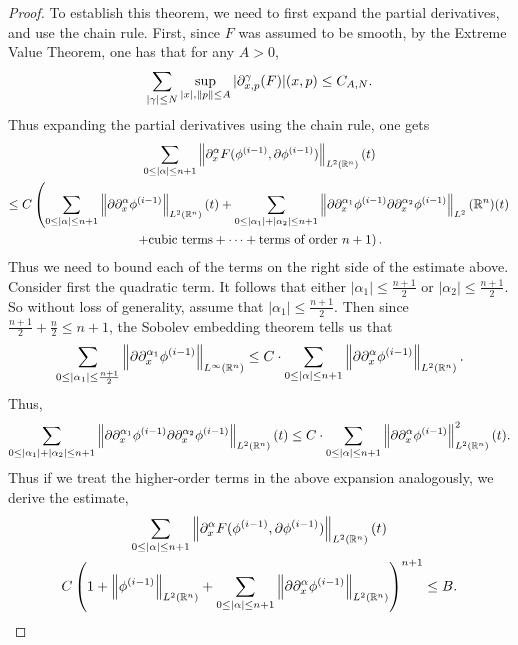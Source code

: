 \documentclass{article}
\begin{document}
\begin{proof}
	To establish this theorem, we need to first expand the partial derivatives, and use the chain rule. First, since $F$ was assumed to be smooth, by the Extreme Value Theorem, one has that for any $A > 0$, 
	\begin{equation*}
		\sum_{|\gamma|\leq N}\sup_{|x|, \left\Vert p \right\Vert\leq A}|\partial^{\gamma}_{x,p}(F)|(x, p) \leq C_{A, N}. 
	\end{equation*} 
	Thus expanding the partial derivatives using the chain rule, one gets 
	\begin{multline*} 
			\sum_{0 \leq |\alpha| \leq n + 1}\left\Vert \partial_{x}^{\alpha}F(\phi^{(i - 1)}, \partial\phi^{(i - 1)}) \right\Vert_{L^{2}(\mathbb{R}^{n})}(t) \\
			\leq C\left(\sum_{0 \leq |\alpha|\leq n + 1}\left\Vert \partial\partial_{x}^{\alpha}\phi^{(i - 1)} \right\Vert_{L^{2}(\mathbb{R}^{n})}(t) + \sum_{0 \leq |\alpha_{1}| + |\alpha_{2}| \leq n + 1}\left\Vert \partial\partial_{x}^{\alpha_{1}}\phi^{(i-1)}\partial\partial_{x}^{\alpha_{2}}\phi^{(i -1)} \right\Vert_{L^{2}}(\mathbb{R}^{n})(t)\right. \\
			\left. + \text{cubic terms} + \dotsm + \text{terms of order $n + 1$} \right). 
	\end{multline*} 
	Thus we need to bound each of the terms on the right side of the estimate above. Consider first the quadratic term. It follows that either $|\alpha_{1}| \leq \frac{n + 1}{2}$ or $|\alpha_{2}| \leq \frac{n + 1}{2}$. So without loss of generality, assume that $|\alpha_{1}| \leq \frac{n + 1}{2}$. Then since $\frac{n + 1}{2} + \frac{n}{2} \leq n + 1$, the Sobolev embedding theorem tells us that 
	\begin{equation*}
		\sum_{0 \leq |\alpha_{1}|\leq \frac{n + 1}{2}}\left\Vert \partial\partial_{x}^{\alpha_{1}}\phi^{(i - 1)} \right\Vert_{L^{\infty}(\mathbb{R}^{n})} \leq C \cdot \sum_{0 \leq |\alpha|\leq n + 1}\left\Vert \partial\partial_{x}^{\alpha}\phi^{(i - 1)} \right\Vert_{L^{2}(\mathbb{R}^{n})}. 
	\end{equation*}
	Thus, 
	\begin{equation*}
		\sum_{0 \leq |\alpha_{1}| + |\alpha_{2}| \leq n + 1}\left\Vert \partial\partial_{x}^{\alpha_{1}}\phi^{(i - 1)}\partial \partial_{x}^{\alpha_{2}}\phi^{(i - 1)} \right\Vert_{L^{2}(\mathbb{R}^{n})}(t) \leq C \cdot \sum_{0 \leq |\alpha| \leq n + 1}\left\Vert \partial\partial_{x}^{\alpha}\phi^{(i - 1)} \right\Vert_{L^{2}(\mathbb{R}^{n})}^{2}(t). 
	\end{equation*}
	Thus if we treat the higher-order terms in the above expansion analogously, we derive the estimate, 
	\begin{multline*}
		\sum_{0 \leq |\alpha| \leq n + 1}\left\Vert \partial_{x}^{\alpha}F(\phi^{(i - 1)}, \partial\phi^{(i - 1)}) \right\Vert_{L^{2}(\mathbb{R}^{n})}(t) \\
		C\left(1 + \left\Vert \phi^{(i - 1)} \right\Vert_{L^{2}(\mathbb{R}^{n})} + \sum_{0 \leq |\alpha| \leq n + 1}\left\Vert \partial\partial_{x}^{\alpha}\phi^{(i - 1)} \right\Vert_{L^{2}(\mathbb{R}^{n})}\right)^{n + 1} \leq B. 
	\end{multline*} 
\end{proof} 
\end{document}
